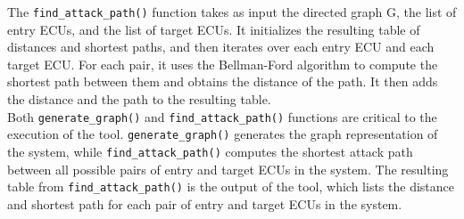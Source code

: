 The \texttt{find\_attack\_path()} function takes as input the directed graph G, the list of entry ECUs, and the list of target ECUs. 
It initializes the resulting table of distances and shortest paths, and then iterates over each entry ECU and each target ECU. 
For each pair, it uses the Bellman-Ford algorithm to compute the shortest path between them and obtains the distance of the path. 
It then adds the distance and the path to the resulting table.\\

Both \texttt{generate\_graph()} and \texttt{find\_attack\_path()} functions are critical to the execution of the tool. 
\texttt{generate\_graph()} generates the graph representation of the system, while \texttt{find\_attack\_path()} computes the shortest attack path between all possible pairs of entry and target ECUs in the system. 
The resulting table from \texttt{find\_attack\_path()} is the output of the tool, which lists the distance and shortest path for each pair of entry and target ECUs in the system.